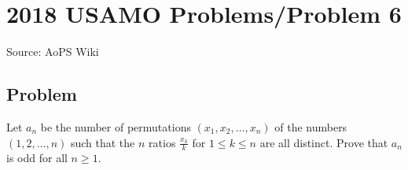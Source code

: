\documentclass[12pt]{article}
\begin{document}
\section*{{2018 USAMO Problems/Problem 6}}
Source: AoPS Wiki

\subsection*{Problem}
Let $a_n$ be the number of permutations $(x_1, x_2, \dots, x_n)$ of the numbers $(1,2,\dots, n)$ such that the $n$ ratios $\frac{x_k}{k}$ for $1\le k\le n$ are all distinct. Prove that $a_n$ is odd for all $n\ge 1.$
\end{document}
